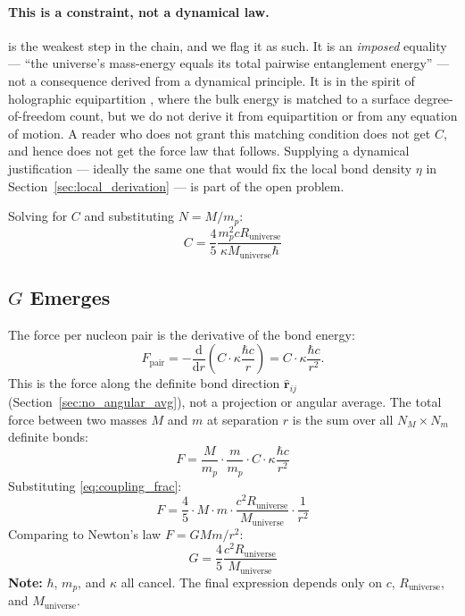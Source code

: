 \documentclass[11pt,letterpaper]{article}
\newcommand{\Runiv}{R_{\mathrm{universe}}}
\newcommand{\Muniv}{M_{\mathrm{universe}}}
\begin{document}
\paragraph{This is a constraint, not a dynamical law.}
 is the weakest step in the chain, and we flag it as
such. It is an \emph{imposed} equality --- ``the universe's mass-energy equals
its total pairwise entanglement energy'' --- not a consequence derived from a
dynamical principle. It is in the spirit of holographic equipartition
\citep{padmanabhan2010}, where the bulk energy is matched to a surface degree-of-freedom
count, but we do not derive it from equipartition or from any equation of
motion. A reader who does not grant this matching condition does not get $C$,
and hence does not get the force law that follows. Supplying a dynamical
justification --- ideally the same one that would fix the local bond density
$\eta$ in Section~\ref{sec:local_derivation} --- is part of the open problem.

Solving for $C$ and substituting $N = M/m_p$:
\begin{equation}
  C = \frac{4}{5} \frac{m_p^2 c \Runiv}{\kappa \Muniv \hbar}
  \label{eq:coupling_frac}
\end{equation}

\subsection{$G$ Emerges}
\label{sec:g_emerges}

The force per nucleon pair is the derivative of the bond energy:
\begin{equation}
  F_{\mathrm{pair}} = -\frac{\mathrm{d}}{\mathrm{d}r}
    \left(C \cdot \kappa \frac{\hbar c}{r}\right)
  = C \cdot \kappa \frac{\hbar c}{r^2}.
  \label{eq:pair_force}
\end{equation}
This is the force along the definite bond direction $\hat{\mathbf{r}}_{ij}$
(Section~\ref{sec:no_angular_avg}), not a projection or angular average.
The total force between two masses $M$ and $m$ at separation $r$ is the sum
over all $N_M \times N_m$ definite bonds:
\begin{equation}
  F = \frac{M}{m_p} \cdot \frac{m}{m_p} \cdot C \cdot \kappa \frac{\hbar c}{r^2}
  \label{eq:total_force}
\end{equation}
Substituting \cref{eq:coupling_frac}:
\begin{equation}
  F = \frac{4}{5} \cdot M \cdot m \cdot \frac{c^2 \Runiv}{\Muniv} \cdot \frac{1}{r^2}
  \label{eq:newton_form}
\end{equation}
Comparing to Newton's law $F = G M m / r^2$:
\begin{equation}
  G = \frac{4}{5} \frac{c^2 \Runiv}{\Muniv}
  \label{eq:final_g}
\end{equation}
\textbf{Note:} $\hbar$, $m_p$, and $\kappa$ all cancel. The final expression depends
only on $c$, $\Runiv$, and $\Muniv$.
\end{document}
